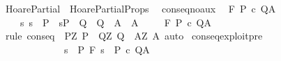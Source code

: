%
\begin{isabellebody}%
%
%
\isamarkuptrue%
%
\isadelimtheory
%
\endisadelimtheory
%
\isatagtheory
{}\isamarkupfalse%
\ HoarePartial\ \ HoarePartialProps\ %
\endisatagtheory
{\isafoldtheory}%
%
\isadelimtheory
%
\endisadelimtheory
\isanewline
\isanewline
{}\isamarkupfalse%
\ conseq{\isacharunderscore}no{\isacharunderscore}aux{\isacharcolon}\isanewline
\ \ {\isachardoublequoteopen}{\isasymlbrakk}{\isasymGamma}{\isacharcomma}{\isasymTheta}{\isasymturnstile}\isactrlbsub {\isacharslash}F\isactrlesub \ P{\isacharprime}\ c\ Q{\isacharprime}{\isacharcomma}A{\isacharprime}{\isacharsemicolon}\isanewline
\ \ \ \ {\isasymforall}s{\isachardot}\ s\ {\isasymin}\ P\ {\isasymlongrightarrow}\ {\isacharparenleft}s{\isasymin}P{\isacharprime}\ {\isasymand}\ {\isacharparenleft}Q{\isacharprime}\ {\isasymsubseteq}\ Q{\isacharparenright}\ {\isasymand}\ {\isacharparenleft}A{\isacharprime}\ {\isasymsubseteq}\ A{\isacharparenright}{\isacharparenright}{\isasymrbrakk}\isanewline
\ \ {\isasymLongrightarrow}\isanewline
\ \ {\isasymGamma}{\isacharcomma}{\isasymTheta}{\isasymturnstile}\isactrlbsub {\isacharslash}F\isactrlesub \ P\ c\ Q{\isacharcomma}A{\isachardoublequoteclose}\isanewline
%
\isadelimproof
\ \ %
\endisadelimproof
%
\isatagproof
{}\isamarkupfalse%
\ {\isacharparenleft}rule\ conseq\ {\isacharbrackleft}\ P{\isacharprime}{\isacharequal}{\isachardoublequoteopen}{\isasymlambda}Z{\isachardot}\ P{\isacharprime}{\isachardoublequoteclose}\ \ Q{\isacharprime}{\isacharequal}{\isachardoublequoteopen}{\isasymlambda}Z{\isachardot}\ Q{\isacharprime}{\isachardoublequoteclose}\ \ A{\isacharprime}{\isacharequal}{\isachardoublequoteopen}{\isasymlambda}Z{\isachardot}\ A{\isacharprime}{\isachardoublequoteclose}{\isacharbrackright}{\isacharparenright}\ auto%
\endisatagproof
{\isafoldproof}%
%
\isadelimproof
\isanewline
%
\endisadelimproof
\isanewline
\isanewline
{}\isamarkupfalse%
\ conseq{\isacharunderscore}exploit{\isacharunderscore}pre{\isacharcolon}\isanewline
\ \ \ \ \ \ \ \ \ \ \ \ \ {\isachardoublequoteopen}{\isasymlbrakk}{\isasymforall}s\ {\isasymin}\ P{\isachardot}\ {\isasymGamma}{\isacharcomma}{\isasymTheta}{\isasymturnstile}\isactrlbsub {\isacharslash}F\isactrlesub \ {\isacharparenleft}{\isacharbraceleft}s{\isacharbraceright}\ {\isasyminter}\ P{\isacharparenright}\ c\ Q{\isacharcomma}A{\isasymrbrakk}\isanewline

\end{isabellebody}
